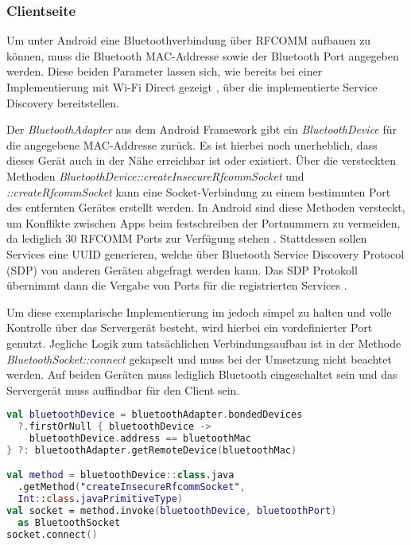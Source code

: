         \subsubsection{Clientseite}
        Um unter Android eine Bluetoothverbindung über RFCOMM aufbauen zu können, muss die Bluetooth MAC-Addresse sowie der Bluetooth Port angegeben werden. Diese beiden Parameter lassen sich, wie bereits bei einer Implementierung mit Wi-Fi Direct gezeigt \cite{aiProject}, über die implementierte Service Discovery bereitstellen.
        
        Der {\it BluetoothAdapter} aus dem Android Framework gibt ein {\it BluetoothDevice} für die angegebene MAC-Addresse zurück. Es ist hierbei noch unerheblich, dass dieses Gerät auch in der Nähe erreichbar ist oder existiert. Über die versteckten Methoden {\it BluetoothDevice::createInsecureRfcommSocket} und {\it ::createRfcommSocket} kann eine Socket-Verbindung zu einem bestimmten Port des entfernten Gerätes erstellt werden. In Android sind diese Methoden versteckt, um Konflikte zwischen Apps beim festschreiben der Portnummern zu vermeiden, da lediglich 30 RFCOMM Ports zur Verfügung stehen \cite{bluezRfcomm}. Stattdessen sollen Services eine UUID generieren, welche über Bluetooth Service Discovery Protocol (SDP) von anderen Geräten abgefragt werden kann. Das SDP Protokoll übernimmt dann die Vergabe von Ports für die registrierten Services \cite{androidBluetooth}.
        
        Um diese exemplarische Implementierung im  jedoch simpel zu halten und volle Kontrolle über das Servergerät besteht, wird hierbei ein vordefinierter Port genutzt. Jegliche Logik zum tatsächlichen Verbindungsaufbau ist in der Methode {\it BluetoothSocket::connect} gekapselt und muss bei der Umsetzung nicht beachtet werden. Auf beiden Geräten muss lediglich Bluetooth eingeschaltet sein und das Servergerät muss auffindbar für den Client sein.
        
        \begin{lstlisting}[frame=bt, label={lst:android:bluetooth}, language=Kotlin, caption=Verbindungsaufbau mit Bluetooth (Clientcode in Kotlin)]
val bluetoothDevice = bluetoothAdapter.bondedDevices
  ?.firstOrNull { bluetoothDevice ->
    bluetoothDevice.address == bluetoothMac
} ?: bluetoothAdapter.getRemoteDevice(bluetoothMac)

val method = bluetoothDevice::class.java
  .getMethod("createInsecureRfcommSocket",
  Int::class.javaPrimitiveType)
val socket = method.invoke(bluetoothDevice, bluetoothPort)
  as BluetoothSocket
socket.connect()
        \end{lstlisting}
         
